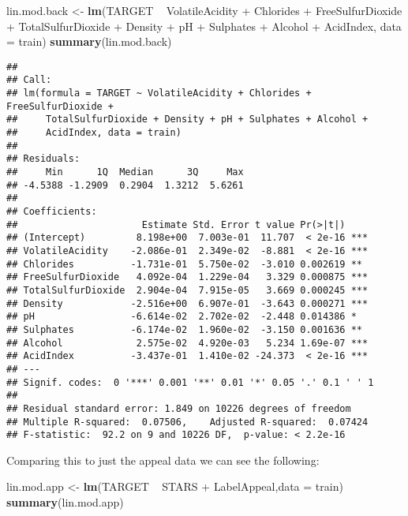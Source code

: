 \documentclass[]{article}
\newenvironment{Shaded}{\begin{snugshade}}{\end{snugshade}}
\newcommand{\KeywordTok}[1]{\textcolor[rgb]{0.13,0.29,0.53}{\textbf{{#1}}}}
\newcommand{\DataTypeTok}[1]{\textcolor[rgb]{0.13,0.29,0.53}{{#1}}}
\newcommand{\StringTok}[1]{\textcolor[rgb]{0.31,0.60,0.02}{{#1}}}
\newcommand{\NormalTok}[1]{{#1}}
\begin{document}
\begin{Shaded}
\begin{Highlighting}[]
\NormalTok{lin.mod.back <-}\StringTok{ }\KeywordTok{lm}\NormalTok{(TARGET ~}\StringTok{ }\NormalTok{VolatileAcidity +}\StringTok{ }\NormalTok{Chlorides +}\StringTok{ }\NormalTok{FreeSulfurDioxide +}\StringTok{ }
\StringTok{    }\NormalTok{TotalSulfurDioxide +}\StringTok{ }\NormalTok{Density +}\StringTok{ }\NormalTok{pH +}\StringTok{ }\NormalTok{Sulphates +}\StringTok{ }\NormalTok{Alcohol +}\StringTok{ }
\StringTok{    }\NormalTok{AcidIndex, }\DataTypeTok{data =} \NormalTok{train)}
\KeywordTok{summary}\NormalTok{(lin.mod.back)}
\end{Highlighting}
\end{Shaded}

\begin{verbatim}
## 
## Call:
## lm(formula = TARGET ~ VolatileAcidity + Chlorides + FreeSulfurDioxide + 
##     TotalSulfurDioxide + Density + pH + Sulphates + Alcohol + 
##     AcidIndex, data = train)
## 
## Residuals:
##     Min      1Q  Median      3Q     Max 
## -4.5388 -1.2909  0.2904  1.3212  5.6261 
## 
## Coefficients:
##                      Estimate Std. Error t value Pr(>|t|)    
## (Intercept)         8.198e+00  7.003e-01  11.707  < 2e-16 ***
## VolatileAcidity    -2.086e-01  2.349e-02  -8.881  < 2e-16 ***
## Chlorides          -1.731e-01  5.750e-02  -3.010 0.002619 ** 
## FreeSulfurDioxide   4.092e-04  1.229e-04   3.329 0.000875 ***
## TotalSulfurDioxide  2.904e-04  7.915e-05   3.669 0.000245 ***
## Density            -2.516e+00  6.907e-01  -3.643 0.000271 ***
## pH                 -6.614e-02  2.702e-02  -2.448 0.014386 *  
## Sulphates          -6.174e-02  1.960e-02  -3.150 0.001636 ** 
## Alcohol             2.575e-02  4.920e-03   5.234 1.69e-07 ***
## AcidIndex          -3.437e-01  1.410e-02 -24.373  < 2e-16 ***
## ---
## Signif. codes:  0 '***' 0.001 '**' 0.01 '*' 0.05 '.' 0.1 ' ' 1
## 
## Residual standard error: 1.849 on 10226 degrees of freedom
## Multiple R-squared:  0.07506,    Adjusted R-squared:  0.07424 
## F-statistic:  92.2 on 9 and 10226 DF,  p-value: < 2.2e-16
\end{verbatim}

Comparing this to just the appeal data we can see the following:

\begin{Shaded}
\begin{Highlighting}[]
\NormalTok{lin.mod.app <-}\StringTok{ }\KeywordTok{lm}\NormalTok{(TARGET ~}\StringTok{ }\NormalTok{STARS +}\StringTok{ }\NormalTok{LabelAppeal,}\DataTypeTok{data =} \NormalTok{train) }
\KeywordTok{summary}\NormalTok{(lin.mod.app)}
\end{Highlighting}
\end{Shaded}
\end{document}
